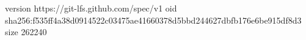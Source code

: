 version https://git-lfs.github.com/spec/v1
oid sha256:f535ff4a38d0914522c03475ae41660378d5bbd244627dbfb176e6be915df8d3
size 262240
